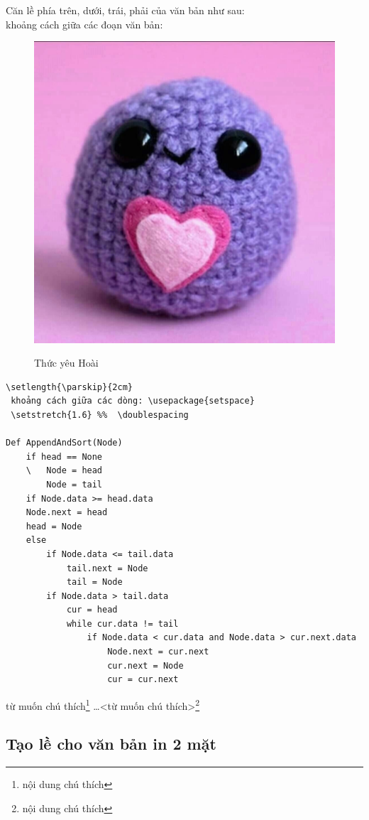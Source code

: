 Căn lề phía trên, dưới, trái, phải của văn bản như sau:\\
khoảng cách giữa các đoạn văn bản:

\begin{figure}[h]
\centering
	\caption{Thức yêu Hoài}
	\includegraphics[scale=0.1]{figures/thuchoai}
	\label{fig:th}
	
\end{figure}
\begin{verbatim}
\setlength{\parskip}{2cm}
 khoảng cách giữa các dòng: \usepackage{setspace}
 \setstretch{1.6} %%  \doublespacing
 
Def AppendAndSort(Node)
	if head == None
	\	Node = head
		Node = tail
 	if Node.data >= head.data
	Node.next = head
	head = Node
 	else
		if Node.data <= tail.data
			tail.next = Node
			tail = Node
		if Node.data > tail.data
			cur = head
 			while cur.data != tail
				if Node.data < cur.data and Node.data > cur.next.data
					Node.next = cur.next
					cur.next = Node
					cur = cur.next

\end{verbatim}


từ muốn chú thích\footnote{nội dung chú thích}
…<từ muốn chú thích>\footnote{nội dung chú thích}
	\subsection{Tạo lề cho văn bản in 2 mặt}
	\label{ssec:taole}
	
